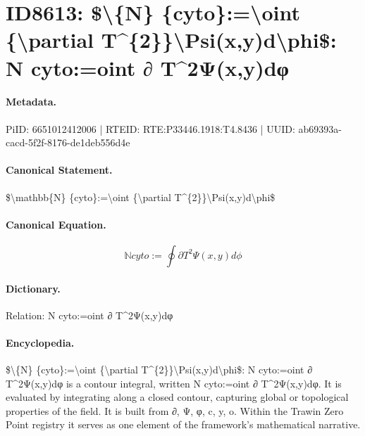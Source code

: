 \section*{ID8613: \$\textbackslash{}\{N\} \{cyto\}:=\textbackslash{}oint \{\textbackslash{}partial T\textasciicircum{}\{2\}\}\textbackslash{}Psi(x,y)d\textbackslash{}phi\$: N cyto:=oint ∂ T\textasciicircum{}2Ψ(x,y)dφ}
\paragraph{Metadata.}
PiID: 6651012412006 | RTEID: RTE:P33446.1918:T4.8436 | UUID: ab69393a-cacd-5f2f-8176-de1deb556d4e

\paragraph{Canonical Statement.}
\$\textbackslash{}mathbb\{N\} \{cyto\}:=\textbackslash{}oint \{\textbackslash{}partial T\textasciicircum{}\{2\}\}\textbackslash{}Psi(x,y)d\textbackslash{}phi\$

\paragraph{Canonical Equation.}
\[
\mathbb{N} {cyto}:=\oint {\partial T^{2}}\Psi(x,y)d\phi
\]

\paragraph{Dictionary.}
Relation: N cyto:=oint ∂ T\textasciicircum{}2Ψ(x,y)dφ

\paragraph{Encyclopedia.}
\$\textbackslash{}\{N\} \{cyto\}:=\textbackslash{}oint \{\textbackslash{}partial T\textasciicircum{}\{2\}\}\textbackslash{}Psi(x,y)d\textbackslash{}phi\$: N cyto:=oint ∂ T\textasciicircum{}2Ψ(x,y)dφ is a contour integral, written N cyto:=oint ∂ T\textasciicircum{}2Ψ(x,y)dφ. It is evaluated by integrating along a closed contour, capturing global or topological properties of the field. It is built from ∂, Ψ, φ, c, y, o. Within the Trawin Zero Point registry it serves as one element of the framework's mathematical narrative.

